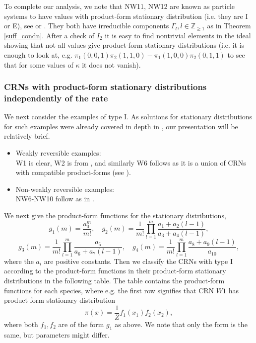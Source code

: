 \documentclass{amsart}
\theoremstyle{definition}
\theoremstyle{remark}
\theoremstyle{Conjecture/open problem}
\theoremstyle{assumption}
\theoremstyle{conjecture}
\def\k{\kappa}
\def\Z{\mathbb{Z}}
\numberwithin{equation}{section}
\begin{document}
To complete our analysis, we note that NW11, NW12 are known as particle systems to have values with product-form stationary distribution (i.e. they are I or E), see \cite[Theorem 2.1]{inclusion_proc} or \cite{hoesslysta}. They both have irreducible components $\Gamma _l, l\in \Z_{\geq 1}$ as in Theorem \ref{suff_condn}. After a check of $I_2$ it is easy to find nontrivial elements in the ideal showing that not all values give product-form stationary distributions (i.e. it is enough to look at, e.g. $\pi_{1}(0,0,1)\pi_{2}(1,1,0)-\pi_{1}(1,0,0)\pi_2(0,1,1)$ to see that for some values of $\k$ it does not vanish).


\subsubsection{CRNs with product-form stationary distributions independently of the rate}\hfill\break
We next consider the examples of type I. As solutions for stationary distributions for such examples were already covered in depth in  \cite{hoesslyuni}, our presentation will be relatively brief.
\begin{itemize}
\item
Weakly reversible examples:\\
W1 is clear, W2 is from \cite[Example 5.1]{hoesslyuni}, and similarly W6 follows as it is a union of CRNs with compatible product-forms (see \cite[Remark 5.3]{hoesslyuni}).\item
Non-weakly reversible examples:\\
NW6-NW10 follow as in \cite[Example 5.1]{hoesslyuni}.
\end{itemize}
We next give the product-form functions for the stationary distributions,
$$g_1(m)=\frac{a_0^m}{m!},\quad g_2(m)=\frac{1}{m!}\prod_{l=1}^{m} \frac{a_1+a_2(l-1)}{a_3+a_4(l-1)},$$
$$g_3(m)=\frac{1}{m!}\prod_{l=1}^{m} \frac{a_5}{a_6+a_7(l-1)},\quad g_4(m)=\frac{1}{m!}\prod_{l=1}^{m} \frac{a_8+a_9(l-1)}{a_{10}},$$
where the $a_i$ are positive constants.
Then we classify the CRNs with type I according to the product-form functions in their product-form stationary distributions in the following table. The table contains the product-form functions for each species, where e.g. the first row signifies that CRN $W1$ has product-form stationary distribution 
$$ \pi(x)=\frac{1}{Z}f_1(x_1)f_2(x_2),$$
where both $f_1,f_2$ are of the form $g_1$ as above. We note that only the form is the same, but parameters might differ.
\end{document}
